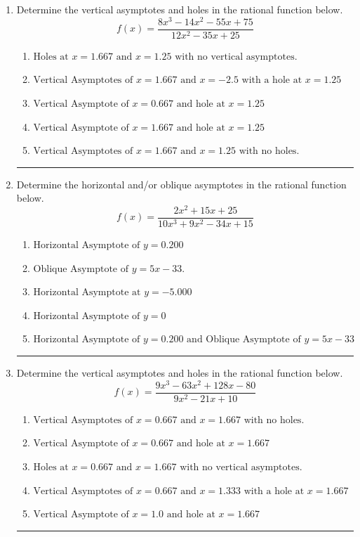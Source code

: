 \documentclass[14pt]{extbook}
\newcommand{\litem}[1]{\item#1\hspace*{-1cm}\rule{\textwidth}{0.4pt}}
\begin{document}
\begin{enumerate}
{\begin{enumerate}[label=\Alph*.]
\end{enumerate} }
\litem{
Determine the vertical asymptotes and holes in the rational function below.\[ f(x) = \frac{8x^{3} -14 x^{2} -55 x + 75}{12x^{2} -35 x + 25} \]\begin{enumerate}[label=\Alph*.]
\item \( \text{Holes at } x = 1.667 \text{ and } x = 1.25 \text{ with no vertical asymptotes.} \)
\item \( \text{Vertical Asymptotes of } x = 1.667 \text{ and } x = -2.5 \text{ with a hole at } x = 1.25 \)
\item \( \text{Vertical Asymptote of } x = 0.667 \text{ and hole at } x = 1.25 \)
\item \( \text{Vertical Asymptote of } x = 1.667 \text{ and hole at } x = 1.25 \)
\item \( \text{Vertical Asymptotes of } x = 1.667 \text{ and } x = 1.25 \text{ with no holes.} \)

\end{enumerate} }
\litem{
Determine the horizontal and/or oblique asymptotes in the rational function below.\[ f(x) = \frac{2x^{2} +15 x + 25}{10x^{3} +9 x^{2} -34 x + 15} \]\begin{enumerate}[label=\Alph*.]
\item \( \text{Horizontal Asymptote of } y = 0.200  \)
\item \( \text{Oblique Asymptote of } y = 5x -33. \)
\item \( \text{Horizontal Asymptote at } y = -5.000 \)
\item \( \text{Horizontal Asymptote of } y = 0 \)
\item \( \text{Horizontal Asymptote of } y = 0.200 \text{ and Oblique Asymptote of } y = 5x -33 \)

\end{enumerate} }
\litem{
Determine the vertical asymptotes and holes in the rational function below.\[ f(x) = \frac{9x^{3} -63 x^{2} +128 x -80}{9x^{2} -21 x + 10} \]\begin{enumerate}[label=\Alph*.]
\item \( \text{Vertical Asymptotes of } x = 0.667 \text{ and } x = 1.667 \text{ with no holes.} \)
\item \( \text{Vertical Asymptote of } x = 0.667 \text{ and hole at } x = 1.667 \)
\item \( \text{Holes at } x = 0.667 \text{ and } x = 1.667 \text{ with no vertical asymptotes.} \)
\item \( \text{Vertical Asymptotes of } x = 0.667 \text{ and } x = 1.333 \text{ with a hole at } x = 1.667 \)
\item \( \text{Vertical Asymptote of } x = 1.0 \text{ and hole at } x = 1.667 \)


\end{enumerate}}
\end{enumerate}
\end{document}
